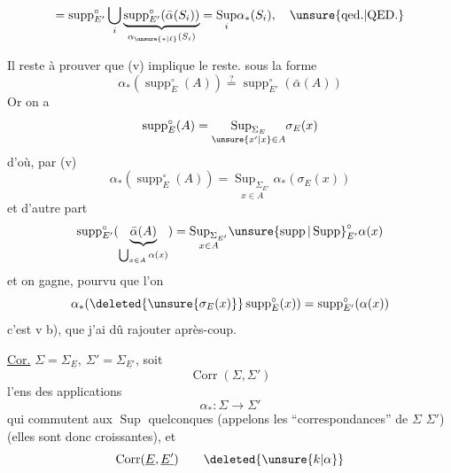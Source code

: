
\[
=\operatorname{supp}^{\circ}_{E'}\bigcup_i\underbrace{\operatorname{supp}^{\circ}_{E'}(\bar\alpha(S_i))}_{\alpha_{\unsure{*|\ell}}(S_i)}=\underset{i}{\operatorname{Sup}}\alpha_*(S_i),\quad\text{\unsure{qed.|QED.}}
\]

Il reste à prouver que (v) implique le reste.  sous la forme 
\[
\alpha_*(\operatorname{supp}^{\circ}_E(A))\overset{?}{=}\operatorname{supp}^{\circ}_{E'}(\bar\alpha(A))
\]
Or on a
\[
\operatorname{supp}^{\circ}_E(A)=\underset{\unsure{x'|x}\in A}{\operatorname{Sup}_{\Sigma_E}}\sigma_E(x)
\]
d'où, par (v)
\[
\alpha_*(\operatorname{supp}^{\circ}_E(A))=\underset{x\in A}{\operatorname{Sup}_{\Sigma_{E'}}}\alpha_*(\sigma_E(x))
\]
et d'autre part
\[
\operatorname{supp}^{\circ}_{E'}(\underbrace{\bar\alpha(A)}_{\bigcup_{x\in A}\alpha(x)})=\underset{x\in A}{\operatorname{Sup}_{\Sigma_{E'}}}{\unsure{\operatorname{supp}|\operatorname{Supp}}}^{\circ}_{E'}\alpha(x)
\]
et on gagne, pourvu que l'on 
\[
\alpha_*(\deleted{\unsure{\sigma_E(x)}}\operatorname{supp}^{\circ}_E(x))=\operatorname{supp}^{\circ}_{E'}(\alpha(x))
\]
c'est v b), que j'ai dû rajouter après-coup.


\uline{Cor.}  $\Sigma=\Sigma_{\underline E},\ \Sigma'=\Sigma_{\underline{E'}}$, soit
\[
\operatorname{Corr}(\Sigma,\Sigma')
\]
l'ens des applications
\[
\alpha_*:\Sigma\longrightarrow\Sigma'
\]
qui commutent aux $\operatorname{Sup}$ quelconques (appelons les ``correspondances''  de $\Sigma$  $\Sigma'$) (elles sont donc croissantes), et
\[
\operatorname{Corr}(\underline E,\underline{E'})\qquad\deleted{\unsure{k|\alpha}}
\]
